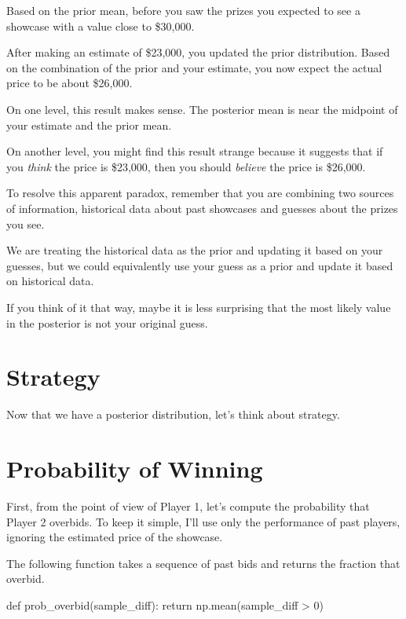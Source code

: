 \documentclass[12pt]{book}
\theoremstyle{exercise}
\begin{document}
Based on the prior mean, before you saw the prizes you expected to see a showcase with a value close to \$30,000.

After making an estimate of \$23,000, you updated the prior distribution.
Based on the combination of the prior and your estimate, you now expect the actual price to be about \$26,000.

On one level, this result makes sense.
The posterior mean is near the midpoint of your estimate and the prior mean.

On another level, you might find this result strange because it
suggests that if you {\em think} the price is \$23,000, then you
should {\em believe} the price is \$26,000.

To resolve this apparent paradox, remember that you are combining two
sources of information, historical data about past showcases and
guesses about the prizes you see.

We are treating the historical data as the prior and updating it
based on your guesses, but we could equivalently use your guess
as a prior and update it based on historical data.

If you think of it that way, maybe it is less surprising that the
most likely value in the posterior is not your original guess.

\section{Strategy}

Now that we have a posterior distribution, let's think about strategy.




\section{Probability of Winning}

First, from the point of view of Player 1, let's compute the probability that Player 2 overbids.
To keep it simple, I'll use only the performance of past players, ignoring the estimated price of the showcase.

The following function takes a sequence of past bids and returns the fraction that overbid.

\begin{code}
def prob_overbid(sample_diff):
    return np.mean(sample_diff > 0)
\end{code}
\end{document}
